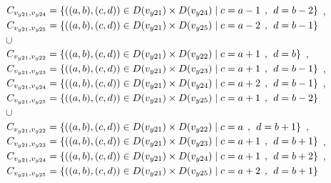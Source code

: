 \\$C_{v_{y21},v_{y24}}=\{((a,b),(c,d))\in D(v_{y21}) \times D(v_{y24})\mid c = a - 1\hspace{1ex} , \hspace{1ex}  d = b - 2 \}$ , 
\\$C_{v_{y21},v_{y25}}=\{((a,b),(c,d))\in D(v_{y21}) \times D(v_{y25})\mid c = a - 2\hspace{1ex} , \hspace{1ex}  d = b - 1 \}$  
\\$\cup$
\\$C_{v_{y21},v_{y22}}=\{((a,b),(c,d))\in D(v_{y21}) \times D(v_{y22})\mid c = a + 1\hspace{1ex} , \hspace{1ex}  d = b   \}$ , 
\\$C_{v_{y21},v_{y23}}=\{((a,b),(c,d))\in D(v_{y21}) \times D(v_{y23})\mid c = a + 1\hspace{1ex} , \hspace{1ex}  d = b - 1 \}$ , 
\\$C_{v_{y21},v_{y24}}=\{((a,b),(c,d))\in D(v_{y21}) \times D(v_{y24})\mid c = a + 2\hspace{1ex} , \hspace{1ex}  d = b - 1 \}$ , 
\\$C_{v_{y21},v_{y25}}=\{((a,b),(c,d))\in D(v_{y21}) \times D(v_{y25})\mid c = a + 1\hspace{1ex} , \hspace{1ex}  d = b - 2 \}$  
\\$\cup$
\\$C_{v_{y21},v_{y22}}=\{((a,b),(c,d))\in D(v_{y21}) \times D(v_{y22})\mid c = a   \hspace{1ex} , \hspace{1ex}  d = b + 1 \}$ , 
\\$C_{v_{y21},v_{y23}}=\{((a,b),(c,d))\in D(v_{y21}) \times D(v_{y23})\mid c = a + 1\hspace{1ex} , \hspace{1ex}  d = b + 1 \}$ , 
\\$C_{v_{y21},v_{y24}}=\{((a,b),(c,d))\in D(v_{y21}) \times D(v_{y24})\mid c = a + 1\hspace{1ex} , \hspace{1ex}  d = b + 2 \}$ , 
\\$C_{v_{y21},v_{y25}}=\{((a,b),(c,d))\in D(v_{y21}) \times D(v_{y25})\mid c = a + 2\hspace{1ex} , \hspace{1ex}  d = b + 1 \}$  
